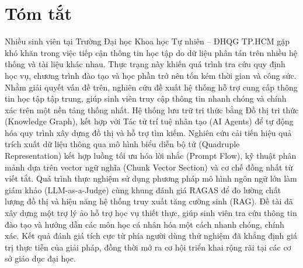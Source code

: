 \chapter*{Tóm tắt}
\label{summary}

Nhiều sinh viên tại Trường Đại học Khoa học Tự nhiên – ĐHQG TP.HCM gặp khó khăn trong việc tiếp cận thông tin học tập do dữ liệu phân tán trên nhiều hệ thống và tài liệu khác nhau. Thực trạng này khiến quá trình tra cứu quy định học vụ, chương trình đào tạo và học phần trở nên tốn kém thời gian và công sức. Nhằm giải quyết vấn đề trên, nghiên cứu đề xuất hệ thống hỗ trợ cung cấp thông tin học tập tập trung, giúp sinh viên truy cập thông tin nhanh chóng và chính xác trên một nền tảng thống nhất. Hệ thống lưu trữ tri thức bằng Đồ thị tri thức (Knowledge Graph), kết hợp với Tác tử trí tuệ nhân tạo (AI Agents) để tự động hóa quy trình xây dựng đồ thị và hỗ trợ tìm kiếm. Nghiên cứu cải tiến hiệu quả trích xuất dữ liệu thông qua mô hình biểu diễn bộ tứ (Quadruple Representation) kết hợp luồng tối ưu hóa lời nhắc (Prompt Flow), kỹ thuật phân mảnh dựa trên vector ngữ nghĩa (Chunk Vector Section) và cơ chế đồng nhất từ viết tắt. Quá trình thực nghiệm sử dụng phương pháp mô hình ngôn ngữ lớn làm giám khảo (LLM-as-a-Judge) cùng khung đánh giá RAGAS để đo lường chất lượng đồ thị và hiệu năng hệ thống truy xuất tăng cường sinh (RAG). Đề tài đã xây dựng một trợ lý ảo hỗ trợ học vụ thiết thực, giúp sinh viên tra cứu thông tin đào tạo và hướng dẫn các môn học cá nhân hóa một cách nhanh chóng, chính xác. Kết quả đánh giá tích cực từ phía người dùng thử nghiệm đã khẳng định giá trị thực tiễn của giải pháp, đồng thời mở ra cơ hội triển khai rộng rãi tại các cơ sở giáo dục đại học.
